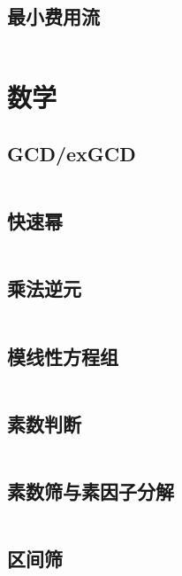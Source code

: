 \documentclass[a4paper]{article}
\newcommand{\cppcode}[1]{
    \inputminted[mathescape]{cpp}{#1}
}
\begin{document}
\cppcode{graph/Dinic.cpp}

\subsection{最小费用流}

\cppcode{graph/min-cost-flow.cpp}






\section{数学}

\subsection{GCD/exGCD}

\cppcode{math/gcd.cpp}

\subsection{快速幂}

\cppcode{math/Fast-Power.cpp}

\subsection{乘法逆元}

\cppcode{math/multiplicative-inverse.cpp}

\subsection{模线性方程组}

\cppcode{math/Congruent-Equations.cpp}

\subsection{素数判断}

\cppcode{math/prime-judge.cpp}

\subsection{素数筛与素因子分解}

\cppcode{math/prime-sieve.cpp}

\subsection{区间筛}
\end{document}
